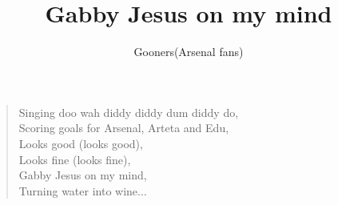 \documentclass[a4paper,12pt]{article}
\title{Gabby Jesus on my mind}
\author{Gooners(Arsenal fans)}
\date{}
\begin{document}
	
	\maketitle
	
	\begin{verse}
		
		Singing doo wah diddy diddy dum diddy do, \\
		Scoring goals for Arsenal, Arteta and Edu, \\
		Looks good (looks good), \\
		Looks fine (looks fine), \\
		Gabby Jesus on my mind, \\
		Turning water into wine$\ldots$
		
	\end{verse}
	
\end{document}
